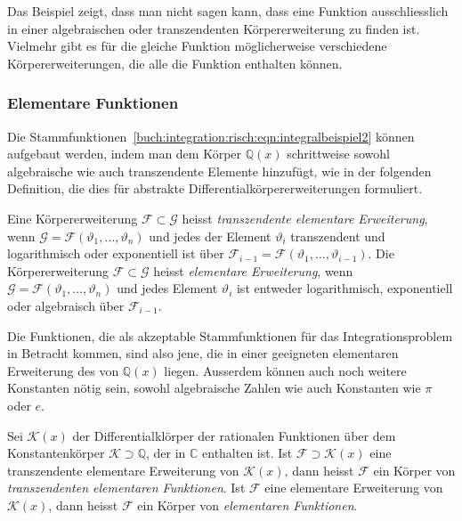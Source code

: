 Das Beispiel zeigt, dass man nicht sagen kann, dass eine Funktion
ausschliesslich in einer algebraischen oder transzendenten Körpererweiterung
zu finden ist. 
Vielmehr gibt es für die gleiche Funktion möglicherweise verschiedene
Körpererweiterungen, die alle die Funktion enthalten können.

%
%
\subsubsection{Elementare Funktionen}
Die Stammfunktionen~\eqref{buch:integration:risch:eqn:integralbeispiel2}
können aufgebaut werden, indem man dem Körper $\mathbb{Q}(x)$ schrittweise
sowohl algebraische wie auch transzendente Elemente hinzufügt,
wie in der folgenden Definition, die dies für abstrakte
Differentialkörpererweiterungen formuliert.

\begin{definition}
Eine Körpererweiterung $\mathscr{F}\subset\mathscr{G}$ heisst 
{\em transzendente elementare Erweiterung}, wenn 
$\mathscr{G} = \mathscr{F}(\vartheta_1,\dots,\vartheta_n)$ und
jedes der Element $\vartheta_i$ transzendent und logarithmisch oder
exponentiell ist über
$\mathscr{F}_{i-1}=\mathscr{F}(\vartheta_1,\dots,\vartheta_{i-1})$.
Die Körpererweiterung $\mathscr{F}\subset\mathscr{G}$ heisst
{\em elementare Erweiterung}, wenn 
$\mathscr{G} = \mathscr{F}(\vartheta_1,\dots,\vartheta_n)$ und
jedes Element $\vartheta_i$ ist entweder logarithmisch, exponentiell
oder algebraisch über $\mathscr{F}_{i-1}$.
\end{definition}

Die Funktionen, die als akzeptable Stammfunktionen für das Integrationsproblem
in Betracht kommen, sind also jene, die in einer geeigneten elementaren
Erweiterung des von $\mathbb{Q}(x)$ liegen.
Ausserdem können auch noch weitere Konstanten nötig sein, sowohl
algebraische Zahlen wie auch Konstanten wie $\pi$ oder $e$.

\begin{definition}
Sei $\mathscr{K}(x)$ der Differentialklörper der rationalen Funktionen
über dem Konstantenkörper $\mathscr{K}\supset\mathbb{Q}$, der in $\mathbb{C}$
enthalten ist.
Ist $\mathscr{F}\supset \mathscr{K}(x)$ eine transzendente elementare 
Erweiterung von $\mathscr{K}(x)$, dann heisst $\mathscr{F}$
ein Körper von {\em transzendenten elementaren Funktionen}.
Ist $\mathscr{F}$ eine elementare Erweiterung von $\mathscr{K}(x)$, dann
heisst $\mathscr{F}$ ein Körper von {\em elementaren Funktionen}.
\end{definition}

